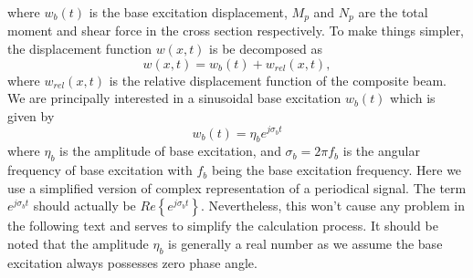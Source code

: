 \documentclass{svjour3}                     %
\begin{document}
where $w_b(t)$ is the base excitation displacement, $M_p$ and $N_p$ are the total moment and shear force in the cross section respectively. To make things simpler, the displacement function $w(x,t)$ is be decomposed as 
\begin{equation}
    w(x,t) = w_b(t) + w_{rel}(x,t),
\end{equation}
where $w_{rel}(x,t)$ is the relative displacement function of the composite beam. We are principally interested in a sinusoidal base excitation $w_b(t)$ which is given by
\begin{equation}
    w_b(t) = \eta_b e^{j \sigma_b t}
\end{equation}
where $\eta_b$ is the amplitude of base excitation, and $\sigma_b = 2 \pi f_b$ is the angular frequency of base excitation with $f_b$ being the base excitation frequency. Here we use a simplified version of complex representation of a periodical signal. The term $e^{j \sigma_b t}$ should actually be $Re\left\{e^{j \sigma_b t}\right\}$. Nevertheless, this won't cause any problem in the following text and serves to simplify the calculation process. It should be noted that the amplitude $\eta_b$ is generally a real number as we assume the base excitation always possesses zero phase angle. 
\end{document}
